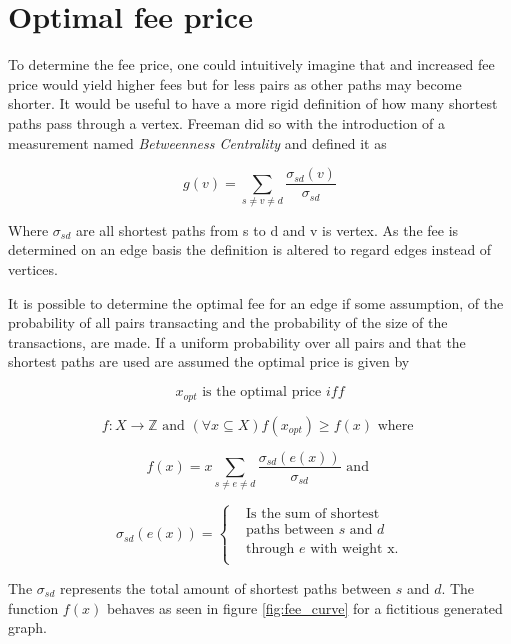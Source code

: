 \section{Optimal fee price}

To determine the fee price, one could intuitively imagine that and increased fee price would yield higher fees but for less pairs as other paths may become shorter. It would be useful to have a more rigid definition of how many shortest paths pass through a vertex. Freeman did so with the introduction of a measurement named \textit{Betweenness Centrality}\cite{freeman:betweenness:centrality} and defined it as

\[ g(v) = \sum_{s \neq v \neq d}\frac{\sigma_{sd}(v)}{\sigma_{sd}} \]

Where $\sigma_{sd}$ are all shortest paths from s to d and v is vertex. As the fee is determined on an edge basis the definition is altered to regard edges instead of vertices. 

It is possible to determine the optimal fee for an edge if some assumption, of the probability of all pairs transacting and the probability of the size of the transactions, are made. If a uniform probability over all pairs and that the shortest paths are used are assumed the optimal price is given by

\[ x_{opt} \textrm{ is the optimal price } iff \]

\[ f: X \to \mathbb{Z} \textrm{ and } (\forall x \subseteq X)f(x_{opt}) \geqslant f(x) \textrm{ where }\]

\[ f(x) = x\sum_{s \neq e \neq d}\frac{\sigma_{sd}(e(x))}{\sigma_{sd}} \textrm{ and } \]


\[ \sigma_{sd}(e(x)) =  \begin{cases}
 & \text{Is the sum of shortest } \\
 & \text{paths between $s$ and $d$} \\
& \text{through $e$ with weight x.} \\

\end{cases} \]


The $\sigma_{sd}$ represents the total amount of shortest paths between $s$ and $d$.
The function $f(x)$ behaves as seen in figure \ref{fig:fee_curve} for a fictitious generated graph. 


